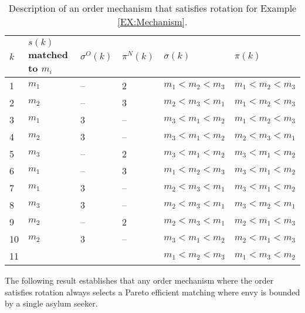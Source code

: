 \documentclass[12pt,fleqn]{article}
\begin{document}
\begin{table}[h!]
\caption{Description of an order mechanism that satisfies rotation for Example \ref{EX:Mechanism}.}\label{TABLE:Mechanism}
\begin{tabular}{llllll}\hline
$k$ & $s(k)$ matched to $m_i$ & $\sigma^O(k)$ & $\pi^N(k)$ & $\sigma(k)$ & $\pi(k)$ \\ \hline
1   & $m_1$ & -- & 2 & $m_1<m_2<m_3$ & $m_1<m_2<m_3$ \\
2   & $m_2$ & -- & 3 & $m_2<m_3<m_1$ & $m_1<m_2<m_3$ \\
3   & $m_1$ & 3 & -- & $m_3<m_1<m_2$ & $m_1<m_2<m_3$ \\
4   & $m_2$ & 3 & -- & $m_3<m_1<m_2$ & $m_2<m_3<m_1$ \\
5   & $m_3$ & -- & 2 & $m_3<m_1<m_2$ & $m_3<m_1<m_2$ \\
6   & $m_1$ & -- & 3 & $m_1<m_2<m_3$ & $m_3<m_1<m_2$ \\
7   & $m_1$ & 3 & -- & $m_2<m_3<m_1$ & $m_3<m_1<m_2$ \\
8   & $m_3$ & 3 & -- & $m_2<m_3<m_1$ & $m_3<m_2<m_1$ \\
9   & $m_2$ & -- & 2 & $m_2<m_3<m_1$ & $m_2<m_1<m_3$ \\
10  & $m_2$ & 3 & -- & $m_3<m_1<m_2$ & $m_2<m_1<m_3$ \\
11  &       &   &    & $m_1<m_2<m_3$ & $m_1<m_3<m_2$ \\ \hline
\end{tabular}
\end{table}

\noindent The following result establishes that any order mechanism where the order satisfies rotation always selects a Pareto efficient matching where envy is bounded by a single asylum seeker.
\end{document}
